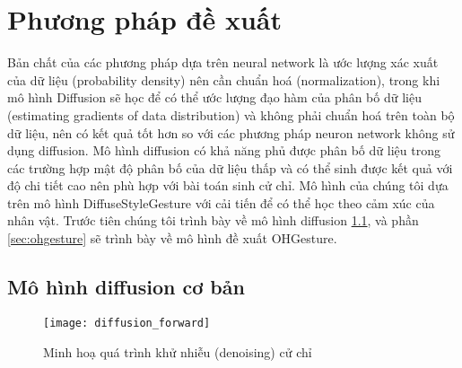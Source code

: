 %   

\chapter{Phương pháp đề xuất}
\label{Chapter3}


Bản chất của các phương pháp dựa trên neural network là ước lượng xác xuất của dữ liệu (probability density) nên cần chuẩn hoá (normalization), trong khi mô hình Diffusion sẽ học để có thể ước lượng đạo hàm của phân bố dữ liệu (estimating gradients of data distribution) và không phải chuẩn hoá trên toàn bộ dữ liệu, nên có kết quả tốt hơn so với các phương pháp neuron network không sử dụng diffusion.
Mô hình diffusion có khả năng phủ được phân bố dữ liệu trong các trường hợp mật độ phân bố của dữ liệu thấp  và có thể sinh được kết quả với độ chi tiết cao nên phù hợp với bài toán sinh cử chỉ. Mô hình của chúng tôi dựa trên mô hình DiffuseStyleGesture \cite{yang2022DiffuseStyleGestureplus} với cải tiến để có thể học theo cảm xúc của nhân vật. Trước tiên chúng tôi trình bày về mô hình diffusion \ref{sec:summary_diffusion}, và phần \ref{sec:ohgesture} sẽ trình bày về mô hình đề xuất OHGesture. 


\section{Mô hình diffusion cơ bản}
\label{sec:summary_diffusion}

\setcounter{figure}{4}
\begin{figure}
	\centering
	\texttt{[image: diffusion\_forward]}
	\caption{Minh hoạ quá trình khử nhiễu (denoising) cử chỉ}
	\label{fig:diffusion_forward}
\end{figure}


